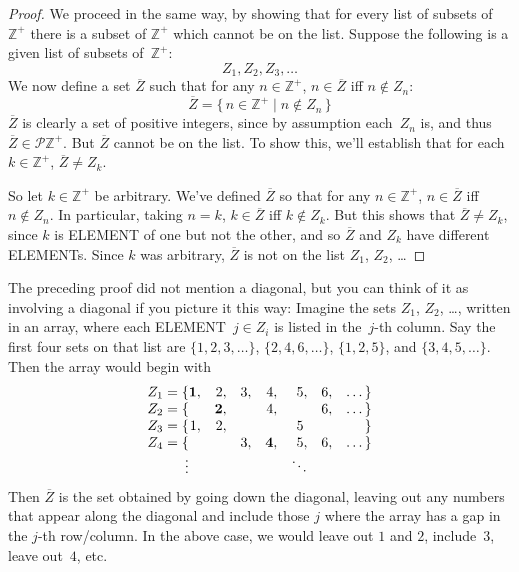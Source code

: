 \documentclass[10pt,a4paper]{article}
\newcommand*{\olup}[1]{\MakeUppercase{#1}}
\theoremstyle{plain}
\theoremstyle{definition}
\theoremstyle{remark}
\newenvironment{explain}{}{}
\providecommand{\PosInt}{\mathbb{Z}^{+}}
\providecommand{\Pow}{\mathcal{P}}
\providecommand{\Setabs}[2]{\{\, #1 \mid #2 \,\}}
\begin{document}
\begin{proof}
We proceed in the same way, by showing that for every list of subsets
of~$\PosInt$ there is a subset of $\PosInt$ which cannot be on the list.
Suppose the following is a given list of subsets of~$\PosInt$:
\[
Z_{1}, Z_{2}, Z_{3}, \dots
\]
We now define a set $\overline{Z}$ such that for any $n \in \PosInt$,
$n \in \overline{Z}$ iff $n \notin Z_{n}$:
\[
\overline{Z} = \Setabs{n \in \PosInt}{n \notin Z_n}
\]
$\overline{Z}$ is clearly a set of positive integers, since by
assumption each~$Z_n$ is, and thus $\overline{Z} \in
\Pow{\PosInt}$. But $\overline{Z}$ cannot be on the list.  To show
this, we'll establish that for each $k \in \PosInt$, $\overline{Z} \neq
Z_k$. 

So let $k \in \PosInt$ be arbitrary. We've defined $\overline{Z}$ so
that for any $n \in \PosInt$, $n \in \overline{Z}$ iff $n \notin Z_n$.
In particular, taking $n=k$, $k \in \overline{Z}$ iff $k \notin Z_k$.
But this shows that $\overline{Z} \neq Z_k$, since $k$ is \olup{element}
of one but not the other, and so $\overline{Z}$ and $Z_k$ have
different \olup{element}s. Since $k$ was arbitrary, $\overline{Z}$ is not
on the list $Z_1$, $Z_2$, \dots
\end{proof}

\begin{explain}
The preceding proof did not mention a diagonal, but you can think of
it as involving a diagonal if you picture it this way: Imagine the
sets $Z_1$, $Z_2$, \dots, written in an array, where each
\olup{element}~$j \in Z_i$ is listed in the~$j$-th column. Say the first
four sets on that list are $\{1,2,3,\dots\}$, $\{2, 4, 6, \dots\}$,
$\{1,2,5\}$, and $\{3,4,5,\dots\}$. Then the array would begin with
\[
\begin{array}{r@{}rrrrrrr}
  Z_1 = \{ & \mathbf{1}, & 2, & 3, & 4, & 5, & 6, & \dots\}\\
  Z_2 = \{ &  & \mathbf{2}, &  & 4, &  & 6, & \dots\}\\
  Z_3 = \{ & 1, & 2, &  &  & 5\phantom{,} &  & \}\\
  Z_4 = \{ &  &  & 3, & \mathbf{4}, & 5, & 6, & \dots\}\\
  \vdots & & & & & \ddots
\end{array}
\]
Then $\overline{Z}$ is the set obtained by going down the diagonal,
leaving out any numbers that appear along the diagonal and include
those $j$ where the array has a gap in the $j$-th row/column. In the
above case, we would leave out $1$ and $2$, include~$3$, leave
out~$4$, etc.
\end{explain}
\end{document}
